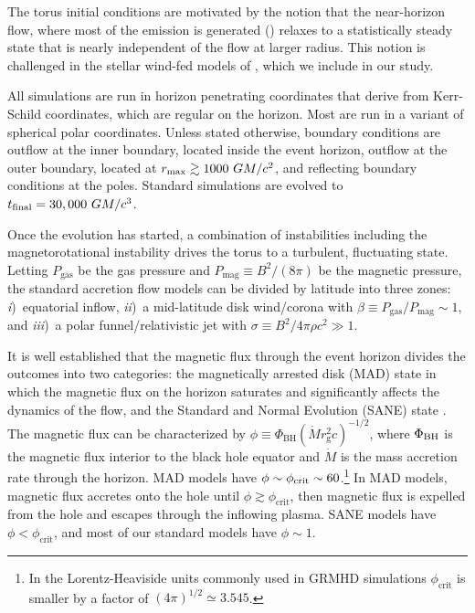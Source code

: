 The torus initial conditions are motivated by the notion that the near-horizon flow, where most of the emission is generated () relaxes to a statistically steady state that is nearly independent of the flow at larger radius.  This notion is challenged in the stellar wind-fed models of \cite{2020ApJ...896L...6R}, which we include in our study.

All simulations are run in horizon penetrating coordinates that derive from Kerr-Schild coordinates, which are regular on the horizon.
Most are run in a variant of spherical polar coordinates.
Unless stated otherwise, boundary conditions are outflow at the inner boundary, located inside the event horizon, outflow at the outer boundary, located at $r_{\rm max} \gtrsim 1000~GM/c^2$, and reflecting boundary conditions at the poles.
Standard simulations are evolved to $t_\mathrm{final} = 30,000~GM/c^3$.

Once the evolution has started, a combination of instabilities including the magnetorotational instability \citep[MRI][]{1992ApJ...400..610B} drives the torus to a turbulent, fluctuating state.
Letting $P_\mathrm{gas}$ be the gas pressure and $P_\mathrm{mag} \equiv B^2 / (8\pi)$ be the magnetic pressure, the standard accretion flow models can be divided by latitude into three zones:
\emph{i})~equatorial inflow,
\emph{ii})~a mid-latitude disk wind/corona with  $\beta  \equiv P_\mathrm{gas} / P_\mathrm{mag} \sim 1$, and
\emph{iii})~a polar funnel/relativistic jet with $\sigma \equiv B^2/4\pi \rho c^2 \gg 1$.

It is well established  that the magnetic flux through the event horizon divides the outcomes into two categories: the magnetically arrested disk (MAD) state \citep[e.g.,][]{1974Ap&SS..28...45B, 2003ApJ...592.1042I, 2003PASJ...55L..69N} in which the magnetic flux on the horizon saturates and significantly affects the dynamics of the flow, and the Standard and Normal Evolution (SANE) state \citep[e.g.,][]{2003ApJ...589..444G, 2003ApJ...599.1238D, 2012MNRAS.426.3241N}.
The magnetic flux can be characterized by $\phi \equiv \Phi_{\mathrm{BH}} (\dot{M} r_\mathrm{g}^2 c)^{-1/2}$, where $\Phi_{\rm BH}$ is the magnetic flux interior to the black hole equator and $\dot{M}$ is the mass accretion rate through the horizon.
MAD models have $\phi \sim \phi_{\rm crit} \sim 60$.\footnote{In the Lorentz-Heaviside units commonly used in GRMHD simulations $\phi_\mathrm{crit}$ is smaller by a factor of $(4\pi)^{1/2} \simeq 3.545$.}
In MAD models, magnetic flux accretes onto the hole until $\phi \gtrsim \phi_\mathrm{crit}$, then magnetic flux is expelled from the hole and escapes through the inflowing plasma.  SANE models have $\phi < \phi_\mathrm{crit}$, and most of our standard models have $\phi \sim 1$.


